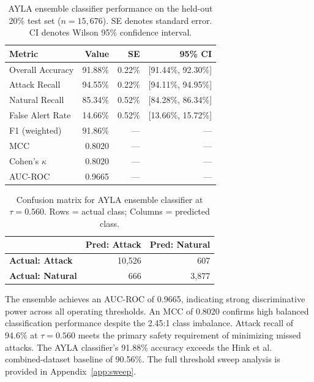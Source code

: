 \documentclass[twocolumn, 10pt, letterpaper]{article}
\begin{document}
\begin{table}[H]
\centering
\caption{AYLA ensemble classifier performance on the held-out 20\% test set ($n{=}15{,}676$).
         SE denotes standard error. CI denotes Wilson 95\% confidence interval.}
\label{tab:classifier}
\small
\begin{tabular}{lrrr}
\toprule
\textbf{Metric} & \textbf{Value} & \textbf{SE} & \textbf{95\% CI} \\
\midrule
Overall Accuracy   & 91.88\% & 0.22\% & [91.44\%, 92.30\%] \\
Attack Recall      & 94.55\% & 0.22\% & [94.11\%, 94.95\%] \\
Natural Recall     & 85.34\% & 0.52\% & [84.28\%, 86.34\%] \\
False Alert Rate   & 14.66\% & 0.52\% & [13.66\%, 15.72\%] \\
F1 (weighted)      & 91.86\% & ---    & --- \\
MCC                & 0.8020  & ---    & --- \\
Cohen's $\kappa$   & 0.8020  & ---    & --- \\
AUC-ROC            & 0.9665  & ---    & --- \\
\bottomrule
\end{tabular}
\end{table}

\begin{table}[H]
\centering
\caption{Confusion matrix for AYLA ensemble classifier at $\tau{=}0.560$.
         Rows = actual class; Columns = predicted class.}
\label{tab:cm}
\small
\begin{tabular}{lrr}
\toprule
 & \textbf{Pred: Attack} & \textbf{Pred: Natural} \\
\midrule
\textbf{Actual: Attack}  & 10{,}526 & 607 \\
\textbf{Actual: Natural} & 666      & 3{,}877 \\
\bottomrule
\end{tabular}
\end{table}

The ensemble achieves an AUC-ROC of 0.9665, indicating strong discriminative
power across all operating thresholds.
An MCC of 0.8020 confirms high balanced classification performance despite the
2.45:1 class imbalance.
Attack recall of 94.6\% at $\tau{=}0.560$ meets the primary safety requirement of
minimizing missed attacks.
The AYLA classifier's 91.88\% accuracy exceeds the Hink et al.\ \cite{hink2014ml}
combined-dataset baseline of 90.56\%.
The full threshold sweep analysis is provided in Appendix~\ref{app:sweep}.
\end{document}
